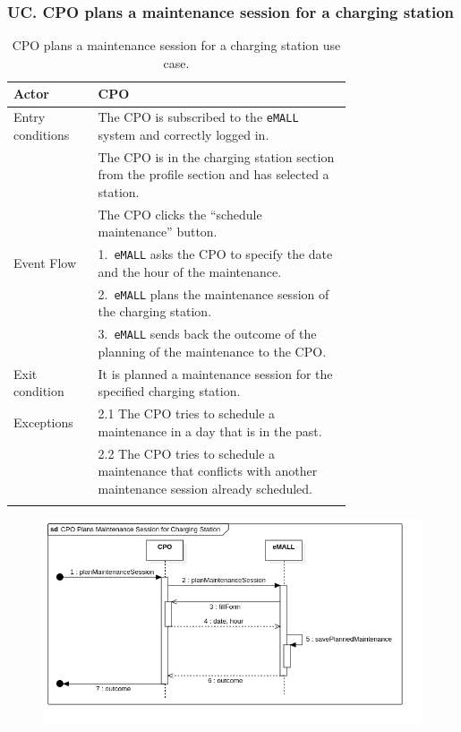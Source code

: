\subsubsection*{UC\cuc . CPO plans a maintenance session for a charging station}
\begin{center}
    \begin{longtable}{lp{0.75\linewidth}}
        \hline
        Actor            & CPO                                                                                             \\
        \hline
        Entry conditions & The CPO is subscribed to the \verb|eMALL| system and correctly logged in.                       \\
        & The CPO is in the charging station section from the profile section and has selected a station. \\
        & The CPO clicks the ``schedule maintenance'' button.                                             \\
        \hline
        Event Flow       & 1.\ \verb|eMALL| asks the CPO to specify the date and the hour of the maintenance.              \\
        & 2.\ \verb|eMALL| plans the maintenance session of the charging station.                         \\
        & 3.\ \verb|eMALL| sends back the outcome of the planning of the maintenance to the CPO.          \\
        \hline
        Exit condition   & It is planned a maintenance session for the specified charging station.                         \\
        \hline
        Exceptions       & 2.1 The CPO tries to schedule a maintenance in a day that is in the past.                                      \\
        & 2.2 The CPO tries to schedule a maintenance that conflicts with another maintenance session already scheduled. \\
        \hline
        \caption{CPO plans a maintenance session for a charging station use case.}
        \label{tab: CPO_plans_maintenance_use_case}
    \end{longtable}
    \begin{figure} [H]
        \begin{center}
            \includegraphics[width=0.9\linewidth]{Images/SequenceDiagrams/cpo_plans_maintenance_session_for_charging_station}

\end{center}
\end{figure}
\end{center}
